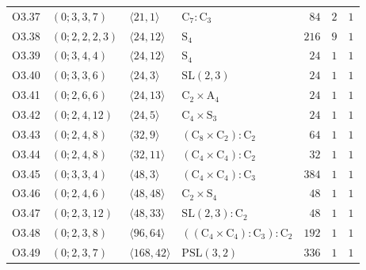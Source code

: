 \begin{center}
\begin{longtable}{|l|l|l|l|r|r|r|}
O3.37 & $(0; 3, 3, 7)$ & $\langle 21, 1 \rangle$ & {\small $\mathrm{C}_{7} \colon \mathrm{C}_{3}$} & $84$ & $2$ & $1$ \\
O3.38 & $(0; 2, 2, 2, 3)$ & $\langle 24, 12 \rangle$ & {\small $\mathrm{S}_{4}$} & $216$ & $9$ & $1$ \\
O3.39 & $(0; 3, 4, 4)$ & $\langle 24, 12 \rangle$ & {\small $\mathrm{S}_{4}$} & $24$ & $1$ & $1$ \\
O3.40 & $(0; 3, 3, 6)$ & $\langle 24, 3 \rangle$ & {\small $\mathrm{SL}(2,3)$} & $24$ & $1$ & $1$ \\
O3.41 & $(0; 2, 6, 6)$ & $\langle 24, 13 \rangle$ & {\small $\mathrm{C}_{2} \times \mathrm{A}_{4}$} & $24$ & $1$ & $1$ \\
O3.42 & $(0; 2, 4, 12)$ & $\langle 24, 5 \rangle$ & {\small $\mathrm{C}_{4} \times \mathrm{S}_{3}$} & $24$ & $1$ & $1$ \\
O3.43 & $(0; 2, 4, 8)$ & $\langle 32, 9 \rangle$ & {\small $(\mathrm{C}_{8} \times \mathrm{C}_{2}) \colon \mathrm{C}_{2}$} & $64$ & $1$ & $1$ \\
O3.44 & $(0; 2, 4, 8)$ & $\langle 32, 11 \rangle$ & {\small $(\mathrm{C}_{4} \times \mathrm{C}_{4}) \colon \mathrm{C}_{2}$} & $32$ & $1$ & $1$ \\
O3.45 & $(0; 3, 3, 4)$ & $\langle 48, 3 \rangle$ & {\small $(\mathrm{C}_{4} \times \mathrm{C}_{4}) \colon \mathrm{C}_{3}$} & $384$ & $1$ & $1$ \\
O3.46 & $(0; 2, 4, 6)$ & $\langle 48, 48 \rangle$ & {\small $\mathrm{C}_{2} \times \mathrm{S}_{4}$} & $48$ & $1$ & $1$ \\
O3.47 & $(0; 2, 3, 12)$ & $\langle 48, 33 \rangle$ & {\small $\mathrm{SL}(2,3) \colon \mathrm{C}_{2}$} & $48$ & $1$ & $1$ \\
O3.48 & $(0; 2, 3, 8)$ & $\langle 96, 64 \rangle$ & {\small $((\mathrm{C}_{4} \times \mathrm{C}_{4}) \colon \mathrm{C}_{3}) \colon \mathrm{C}_{2}$} & $192$ & $1$ & $1$ \\
O3.49 & $(0; 2, 3, 7)$ & $\langle 168, 42 \rangle$ & {\small $\mathrm{PSL}(3,2)$} & $336$ & $1$ & $1$ \\
\end{longtable}
\end{center}
%

